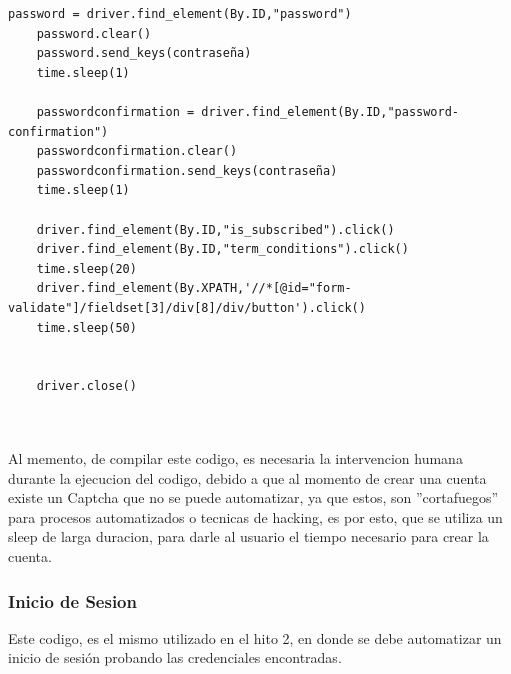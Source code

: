\documentclass{article}
\begin{document}
\begin{lstlisting}[lenguaje=py]
    password = driver.find_element(By.ID,"password")
    password.clear()
    password.send_keys(contraseña)
    time.sleep(1)

    passwordconfirmation = driver.find_element(By.ID,"password-confirmation")
    passwordconfirmation.clear()
    passwordconfirmation.send_keys(contraseña)
    time.sleep(1)

    driver.find_element(By.ID,"is_subscribed").click()
    driver.find_element(By.ID,"term_conditions").click()
    time.sleep(20)
    driver.find_element(By.XPATH,'//*[@id="form-validate"]/fieldset[3]/div[8]/div/button').click()
    time.sleep(50)


    driver.close()
    \end{lstlisting}

    \\\\

    Al memento, de compilar este codigo, es necesaria la intervencion humana durante la ejecucion del codigo, debido a que al momento de crear
    una cuenta existe un Captcha que no se puede automatizar, ya que estos, son ''cortafuegos'' para procesos automatizados o tecnicas de
    hacking, es por esto, que se utiliza un sleep de larga duracion, para darle al usuario el tiempo necesario para crear la cuenta.

\newpage
\subsubsection{Inicio de Sesion}
    Este codigo, es el mismo utilizado en el hito 2, en donde se debe automatizar un inicio de sesión probando las credenciales encontradas.

    \\\\
\end{document}
